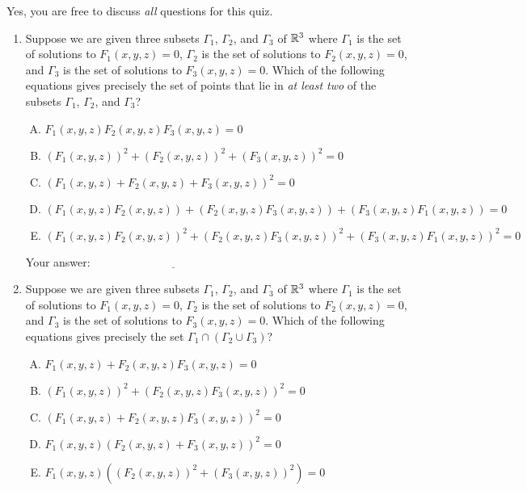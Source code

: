 \documentclass[10pt]{amsart}
\begin{document}
Yes, you are free to discuss {\em all} questions for this quiz.
\begin{enumerate}

\item Suppose we are given three subsets $\Gamma_1$, $\Gamma_2$, and
  $\Gamma_3$ of $\mathbb{R}^3$ where $\Gamma_1$ is the set of solutions to
  $F_1(x,y,z) = 0$, $\Gamma_2$ is the set of solutions to $F_2(x,y,z)
  = 0$, and $\Gamma_3$ is the set of solutions to $F_3(x,y,z) =
  0$. Which of the following equations gives precisely the set of
  points that lie in {\em at least two} of the subsets $\Gamma_1$,
  $\Gamma_2$, and $\Gamma_3$?

  \begin{enumerate}[(A)]
  \item $F_1(x,y,z)F_2(x,y,z)F_3(x,y,z) = 0$
  \item $(F_1(x,y,z))^2 + (F_2(x,y,z))^2 + (F_3(x,y,z))^2 = 0$
  \item $(F_1(x,y,z) + F_2(x,y,z) + F_3(x,y,z))^2 = 0$
  \item $(F_1(x,y,z)F_2(x,y,z)) + (F_2(x,y,z)F_3(x,y,z)) +
    (F_3(x,y,z)F_1(x,y,z)) = 0$
  \item $(F_1(x,y,z)F_2(x,y,z))^2 + (F_2(x,y,z)F_3(x,y,z))^2 +
    (F_3(x,y,z)F_1(x,y,z))^2 = 0$
  \end{enumerate}

  \vspace{0.1in}
  Your answer: $\underline{\qquad\qquad\qquad\qquad\qquad\qquad\qquad}$
  \vspace{0.1in}

\item Suppose we are given three subsets $\Gamma_1$, $\Gamma_2$, and
  $\Gamma_3$ of $\mathbb{R}^3$ where $\Gamma_1$ is the set of solutions to
  $F_1(x,y,z) = 0$, $\Gamma_2$ is the set of solutions to $F_2(x,y,z)
  = 0$, and $\Gamma_3$ is the set of solutions to $F_3(x,y,z) =
  0$. Which of the following equations gives precisely the set
  $\Gamma_1 \cap (\Gamma_2 \cup \Gamma_3)$?

  \begin{enumerate}[(A)]
  \item $F_1(x,y,z) + F_2(x,y,z)F_3(x,y,z) = 0$
  \item $(F_1(x,y,z))^2 + (F_2(x,y,z)F_3(x,y,z))^2 = 0$
  \item $(F_1(x,y,z) + F_2(x,y,z)F_3(x,y,z))^2 = 0$
  \item $F_1(x,y,z)(F_2(x,y,z) + F_3(x,y,z))^2 = 0$
  \item $F_1(x,y,z)((F_2(x,y,z))^2 + (F_3(x,y,z))^2) = 0$
  \end{enumerate}


\end{enumerate}
\end{document}
